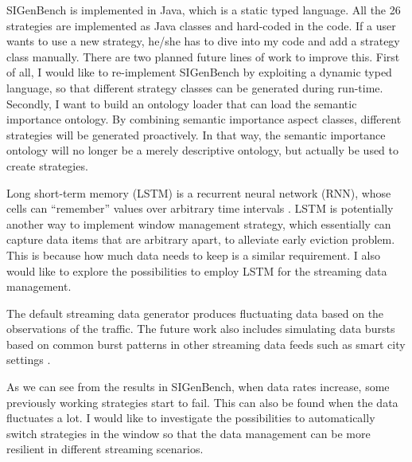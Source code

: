 SIGenBench is implemented in Java, which is a static typed language.
All the 26 strategies are implemented as Java classes and hard-coded in the code. 
If a user wants to use a new strategy, he/she has to dive into my code and add a strategy class manually. 
There are two planned future lines of work to improve this. 
First of all, I would like to re-implement SIGenBench by exploiting a dynamic typed language, so that different strategy classes can be generated during run-time. 
Secondly, I want to build an ontology loader that can load the semantic importance ontology.
By combining semantic importance aspect classes, different strategies will be generated proactively. 
In that way, the semantic importance ontology will no longer be a merely descriptive ontology, but actually be used to create strategies.

Long short-term memory (LSTM) \cite{DBLP:journals/neco/HochreiterS97} is a recurrent neural network (RNN), whose cells can ``remember'' values over arbitrary time intervals \cite{lstmwiki}.
LSTM is potentially another way to implement window management strategy, which essentially can capture data items that are arbitrary apart, to alleviate early eviction problem. 
This is because how much data needs to keep is a similar requirement. 
I also would like to explore the possibilities to employ LSTM for the streaming data management. 

The default streaming data generator produces fluctuating data based on the observations of the traffic. 
The future work also includes simulating data bursts based on common burst patterns in other streaming data feeds such as smart city settings \cite{tonjes2014real}.

As we can see from the results in SIGenBench, when data rates increase, some previously working strategies start to fail.
This can also be found when the data fluctuates a lot.
I would like to investigate the possibilities to automatically switch strategies in the window so that the data management can be more resilient in different streaming scenarios. 
%

